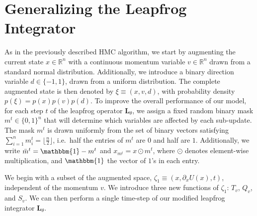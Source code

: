 \documentclass[../main.tex]{subfiles}
\begin{document}
\section{Generalizing the Leapfrog Integrator}
\label{sec:generalizing_lf}
As in the previously described HMC algorithm, we start by augmenting the
current state $x \in \mathbb{R}^n$ with a continuous momentum variable $v \in
\mathbb{R}^{n}$ drawn from a standard normal distribution.
%
Additionally, we introduce a binary direction variable $d \in \{ -1, 1\}$,
drawn from a uniform distribution. 
%
The complete augmented state is then denoted by $\xi \equiv (x, v, d)$, with
probability density $p(\xi) = p(x) p(v)
p(d)$.
%
To improve the overall performance of our model, for each step $t$ of the
leapfrog operator $\mathbf{L}_{\theta}$, we assign a fixed random binary mask
$m^{t} \in{\{0, 1\}}^n$ that will determine which variables are affected by
each sub-update.
%
The mask $m^t$ is drawn uniformly from the set of binary vectors satisfying
$\sum_{i=1}^{n} m_{i}^{t} = \lfloor \frac{n}{2}\rfloor$, i.e.\ half the entries
of $m^t$ are $0$ and half are $1$.
%
Additionally, we write $\bar m^{t} = \mathbbm{1} - m^{t}$ and $x_{m^t} = x
\odot m^{t}$, where $\odot$ denotes element-wise multiplication, and
$\mathbbm{1}$ the vector of $1$'s in each entry.
%

We begin with a subset of the augmented space, $\zeta_1 \equiv (x, \partial_{x}
U(x), t)$, independent of the momentum $v$.
%
We introduce three new functions of $\zeta_1$: $T_v$, $Q_v$, and $S_v$.
%
We can then perform a single time-step of our modified leapfrog integrator
$\mathbf{L}_{\theta}$.
%
\end{document}
